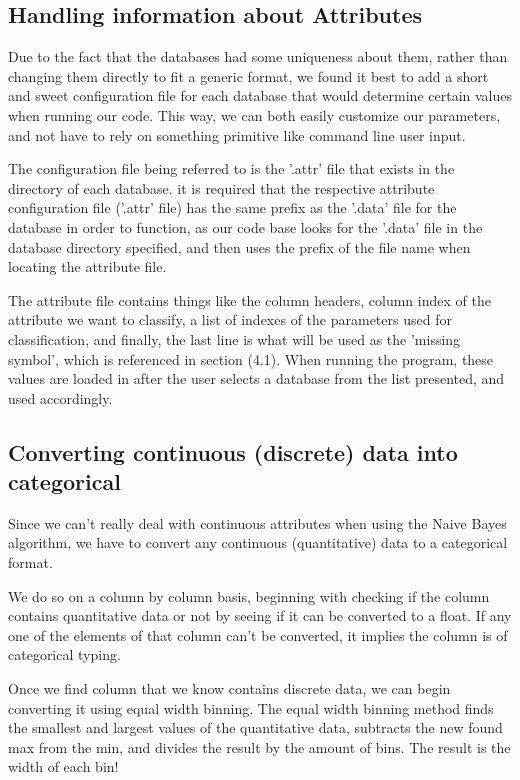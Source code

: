 \documentclass[twoside,11pt]{article}
\begin{document}
\subsection{Handling information about Attributes}
Due to the fact that the databases had some uniqueness about them, rather than changing them directly to fit a generic format, we found it best to add a short and sweet configuration file for each database that would determine certain values when running our code. This way, we can both easily customize our parameters, and not have to rely on something primitive like command line user input. 

The configuration file being referred to is the '.attr' file that exists in the directory of each database. it is required that the respective attribute configuration file ('.attr' file) has the same prefix as the '.data' file for the database in order to function, as our code base looks for the '.data' file in the database directory specified, and then uses the prefix of the file name when locating the attribute file. 

The attribute file contains things like the column headers, column index of the attribute we want to classify, a list of indexes of the parameters used for classification, and finally, the last line is what will be used as the 'missing symbol', which is referenced in section (4.1). When running the program, these values are loaded in after the user selects a database from the list presented, and used accordingly.

\subsection{Converting continuous (discrete) data into categorical}

Since we can’t really deal with continuous attributes when using the Naive Bayes algorithm, we have to convert any continuous (quantitative) data to a categorical format. 

We do so on a column by column basis, beginning with checking if the column contains quantitative data or not by seeing if it can be converted to a float. If any one of the elements of that column can’t be converted, it implies the column is of categorical typing. 

Once we find  column that we know contains discrete data, we can begin converting it using equal width binning. The equal width binning method finds the smallest and largest values of the quantitative data, subtracts the new found max from the min, and divides the result by the amount of bins. The result is the width of each bin!
\end{document}
